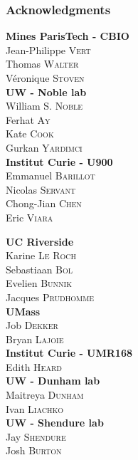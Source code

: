 \documentclass[xcolor=dvipsnames]{beamer}
\begin{document}
\begin{frame}
\frametitle{Acknowledgments}
\fboxsep=0pt
\noindent
\begin{minipage}[t]{0.48\linewidth}
\textbf{Mines ParisTech - CBIO} \\
Jean-Philippe \textsc{Vert} \\
Thomas \textsc{Walter} \\
V\'eronique \textsc{Stoven} \\

\textbf{UW - Noble lab} \\
William S. \textsc{Noble} \\
Ferhat \textsc{Ay} \\
Kate \textsc{Cook} \\
Gurkan \textsc{Yardimci} \\

\textbf{Institut Curie - U900} \\
Emmanuel \textsc{Barillot} \\
Nicolas \textsc{Servant} \\
Chong-Jian \textsc{Chen} \\
Eric \textsc{Viara} \\


\end{minipage}
\hfill%
\begin{minipage}[t]{0.48\linewidth}

\small
\textbf{UC Riverside} \\
Karine \textsc{Le Roch} \\
Sebastiaan \textsc{Bol} \\
Evelien \textsc{Bunnik} \\
Jacques \textsc{Prudhomme} \\

\textbf{UMass} \\
Job \textsc{Dekker} \\
Bryan \textsc{Lajoie} \\


\textbf{Institut Curie - UMR168} \\
Edith \textsc{Heard} \\

\textbf{UW - Dunham lab} \\
Maitreya \textsc{Dunham} \\
Ivan \textsc{Liachko} \\

\textbf{UW - Shendure lab} \\
Jay \textsc{Shendure} \\
Josh \textsc{Burton} \\

\end{minipage}

\end{frame}
\end{document}
